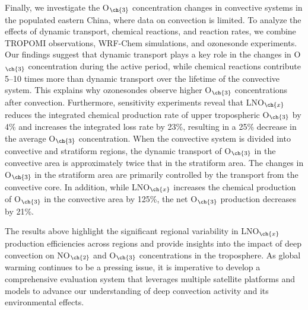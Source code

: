 {Finally, we investigate the O$_{\ch{3}}$ concentration changes in convective systems in the populated eastern China, where data on convection is limited.
To analyze the effects of dynamic transport, chemical reactions, and reaction rates, we combine TROPOMI observations, WRF-Chem simulations, and ozonesonde experiments.
Our findings suggest that dynamic transport plays a key role in the changes in O$_{\ch{3}}$ concentration during the active period,
while chemical reactions contribute 5--10 times more than dynamic transport over the lifetime of the convective system.
This explains why ozonesondes observe higher O$_{\ch{3}}$ concentrations after convection.
Furthermore, sensitivity experiments reveal that LNO$_{\ch{x}}$ reduces the integrated chemical production rate of upper tropospheric O$_{\ch{3}}$ by 4\% and increases the integrated loss rate by 23\%,
resulting in a 25\% decrease in the average O$_{\ch{3}}$ concentration.
When the convective system is divided into convective and stratiform regions,
the dynamic transport of O$_{\ch{3}}$ in the convective area is approximately twice that in the stratiform area.
The changes in O$_{\ch{3}}$ in the stratiform area are primarily controlled by the transport from the convective core.
In addition, while LNO$_{\ch{x}}$ increases the chemical production of O$_{\ch{3}}$ in the convective area by 125\%, the net O$_{\ch{3}}$ production decreases by 21\%.

The results above highlight the significant regional variability in LNO$_{\ch{x}}$ production efficiencies across regions and provide insights into the impact of deep convection on NO$_{\ch{2}}$ and O$_{\ch{3}}$ concentrations in the troposphere.
As global warming continues to be a pressing issue, it is imperative to develop a comprehensive evaluation system that leverages multiple satellite platforms and models to advance our understanding of deep convection activity and its environmental effects.
}
